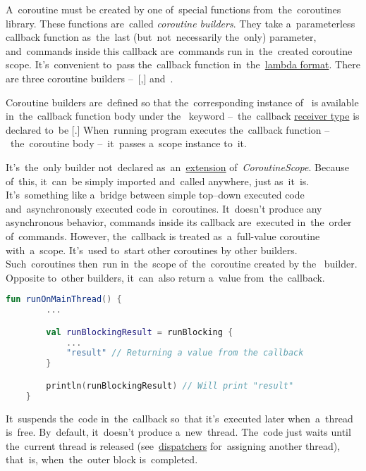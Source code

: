 \label{kotlincoroutinebuilder}
A~coroutine must be created by one of~special functions from~the~coroutines library.
These functions are~called \textit{coroutine builders}.
They take a~parameterless callback function as~the~last (but~not~necessarily the~only) parameter, and~commands inside this callback are~commands run in~the~created coroutine scope.
It's~convenient to~pass the~callback function in~the~\hyperref[kotlinlambda]{lambda format}.
There are three coroutine builders --~[,]  and~.

Coroutine builders are~defined so that the~corresponding instance of~ is available in~the~callback function body under the~ keyword --~the~callback \hyperref[kotlinanonymousreceivertype]{receiver type} is declared to~be [.]
When~running program executes the~callback function --~the~coroutine body --~it~passes a~scope instance to~it.

\label{kotlincoroutinerunblocking}
It's~the~only builder not~declared as~an~\hyperref[kotlinextension]{extension} of~\textit{CoroutineScope}.
Because of~this, it~can~be simply imported and~called anywhere, just as~it~is.
It's~something like a~bridge between simple top--down executed code and~asynchronously executed code in~coroutines.
It~doesn't produce any asynchronous behavior, commands inside its callback are~executed in~the~order of~commands.
However, the~callback is treated as~a~full-value coroutine with~a~scope.
It's~used to~start other coroutines by other builders.
Such~coroutines then~run in~the~scope of~the~coroutine created by the~ builder.
Opposite to~other builders, it~can~also return a~value from~the~callback.

\begin{lstlisting}[language=Kotlin]
    fun runOnMainThread() {
        ...

        val runBlockingResult = runBlocking {
            ...
            "result" // Returning a value from the callback
        }

        println(runBlockingResult) // Will print "result"
    }
\end{lstlisting}

\enlargethispage{5mm}
\label{kotlincoroutinelaunch}
It~suspends the~code in~the~callback so~that it's~executed later when~a~thread is~free.
By~default, it~doesn't produce a~new~thread.
The~code just waits until the~current thread is released (see~\hyperref[kotlincoroutinedispatcher]{dispatchers} for~assigning another thread), that~is, when~the~outer block is~completed.

